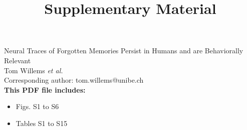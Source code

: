 \documentclass[9pt]{lapreprint}
\title{Supplementary Material}
\author[]{}
\begin{document}
\maketitle
\fussy

\noindent
\huge Neural Traces of Forgotten Memories Persist in Humans and are Behaviorally Relevant
\\

\noindent\Large Tom Willems \textit{et al.}
\\

\noindent\Large Corresponding author: tom.willems@unibe.ch
\\

\noindent\textbf{This PDF file includes:}
\begin{itemize}
    \item Figs. S1 to S6
    \item Tables S1 to S15
\end{itemize}


\newpage

\newpage


\if@endfloat\clearpage\processdelayedfloats\clearpage\fi 


%        
    
%    

%    
    
\end{document}
